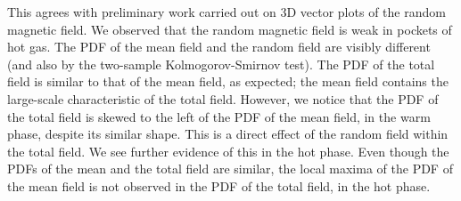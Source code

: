 \documentclass[useAMS,usenatbib]{mn2e}
\begin{document}
This agrees with preliminary work carried out on 3D vector plots of the random magnetic field. We observed that the random magnetic field is weak in pockets of hot gas. The PDF of the mean field and the random field are visibly different (and also by the two-sample Kolmogorov-Smirnov test). The PDF of the total field is similar to that of the mean field, as expected; the mean field contains the large-scale characteristic of the total field. However, we notice that the PDF of the total field is skewed to the left of the PDF of the mean field, in the warm phase, despite its similar shape. This is a direct effect of the random field within the total field. We see further evidence of this in the hot phase. Even though the PDFs of the mean and the total field are similar, the local maxima of the PDF of the mean field is not observed in the PDF of the total field, in the hot phase. 

\end{document}
